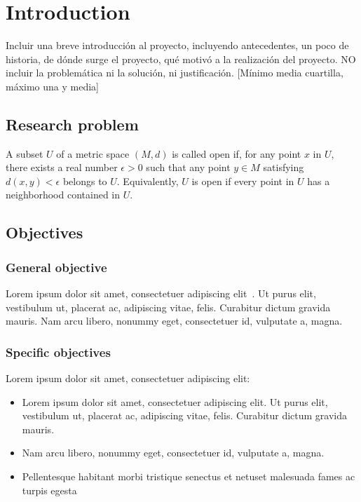 \chapter{Introduction}\label{ch:Introduction}
Incluir una breve introducción al proyecto, incluyendo antecedentes, un poco de historia, de dónde surge el proyecto, qué motivó a la realización del proyecto. NO incluir la problemática ni la solución, ni justificación. [Mínimo media cuartilla, máximo una y media]
\section{Research problem}
\lipsum[1]
\begin{definition}
A subset $U$ of a metric space $(M, d)$ is called open if, for any point $x$ in $U$, there exists a real number $\epsilon > 0$ such that any point $y\in M$ satisfying $d(x, y) < \epsilon$ belongs to $U$. Equivalently, $U$ is open if every point in $U$ has a neighborhood contained in $U$.
\end{definition}
\lipsum[1]

\section{Objectives}
\subsection{General objective}
Lorem ipsum dolor sit amet, consectetuer adipiscing elit~\cite{adam2015higgs, atlas2014neural, baldi2014searching}. Ut purus elit, vestibulum ut, placerat ac, adipiscing vitae, felis. Curabitur dictum gravida mauris. Nam arcu libero, nonummy eget, consectetuer id, vulputate a, magna.

\subsection{Specific objectives}
Lorem ipsum dolor sit amet, consectetuer adipiscing elit:
\begin{itemize}
    \item Lorem ipsum dolor sit amet, consectetuer adipiscing elit. Ut purus elit, vestibulum ut, placerat ac, adipiscing vitae, felis. Curabitur dictum gravida mauris.
    \item Nam arcu libero, nonummy eget, consectetuer id, vulputate a, magna.
    \item  Pellentesque habitant morbi tristique senectus et netuset malesuada fames ac turpis egesta
\end{itemize}

